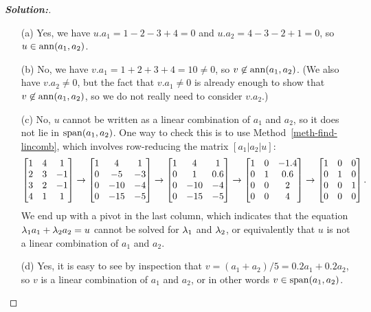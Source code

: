 \documentclass[a4paper]{amsart}
\theoremstyle{definition}
\newenvironment{solution}{\begin{proof}[\textbf{Solution:}] \vphantom{u}}{\end{proof}}
\begin{document}
\begin{solution}
 \begin{itemize}
  \item[(a)] Yes, we have $u.a_1=1-2-3+4=0$ and $u.a_2=4-3-2+1=0$, so
   $u\in\operatorname{ann}(a_1,a_2)$.
  \item[(b)] No, we have $v.a_1=1+2+3+4=10\neq 0$, so
   $v\not\in\operatorname{ann}(a_1,a_2)$.  (We also have $v.a_2\neq 0$, but the fact
   that $v.a_1\neq 0$ is already enough to show that
   $v\not\in\operatorname{ann}(a_1,a_2)$, so we do not really need to consider
   $v.a_2$.)
  \item[(c)] No, $u$ cannot be written as a linear combination of
   $a_1$ and $a_2$, so it does not lie in $\operatorname{span}(a_1,a_2)$.  One way to
   check this is to use Method~\ref{meth-find-lincomb}, which involves
   row-reducing the matrix $[a_1|a_2|u]$:
   \[ 
     \left[\begin{matrix} 1 & 4 & 1 \\
          2 & 3 & -1 \\
          3 & 2 & -1 \\
          4 & 1 &  1 \end{matrix}\right] 
     \to
     \left[\begin{matrix} 1 &   4 &  1 \\
          0 &  -5 & -3 \\
          0 & -10 & -4 \\
          0 & -15 & -5 \end{matrix}\right] 
     \to
     \left[\begin{matrix} 1 &   4 &  1 \\
          0 &   1 & 0.6 \\
          0 & -10 & -4 \\
          0 & -15 & -5 \end{matrix}\right] 
     \to
     \left[\begin{matrix} 1 &   0 & -1.4 \\
          0 &   1 &  0.6 \\
          0 &   0 &  2 \\
          0 &   0 &  4 \end{matrix}\right] 
     \to
     \left[\begin{matrix} 1 &   0 &  0 \\
          0 &   1 &  0 \\
          0 &   0 &  1 \\
          0 &   0 &  0 \end{matrix}\right]. 
   \]
   We end up with a pivot in the last column, which indicates that the
   equation $\lambda_1a_1+\lambda_2a_2=u$ cannot be solved for $\lambda_1$ and
   $\lambda_2$, or equivalently that $u$ is not a linear combination of
   $a_1$ and $a_2$.
  \item[(d)] Yes, it is easy to see by inspection that
   $v=(a_1+a_2)/5=0.2a_1+0.2a_2$, so $v$ is a linear combination of
   $a_1$ and $a_2$, or in other words $v\in\operatorname{span}(a_1,a_2)$.
 \end{itemize}
\end{solution}
\end{document}
